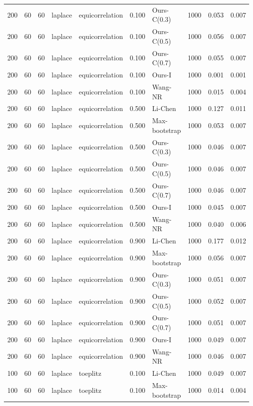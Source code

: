 \begin{tabular}{rrrllrlrrr}
200 & 60 & 60 & laplace & equicorrelation & 0.100 & Ours-C(0.3) & 1000 & 0.053 & 0.007 \\
200 & 60 & 60 & laplace & equicorrelation & 0.100 & Ours-C(0.5) & 1000 & 0.056 & 0.007 \\
200 & 60 & 60 & laplace & equicorrelation & 0.100 & Ours-C(0.7) & 1000 & 0.055 & 0.007 \\
200 & 60 & 60 & laplace & equicorrelation & 0.100 & Ours-I & 1000 & 0.001 & 0.001 \\
200 & 60 & 60 & laplace & equicorrelation & 0.100 & Wang-NR & 1000 & 0.015 & 0.004 \\
200 & 60 & 60 & laplace & equicorrelation & 0.500 & Li-Chen & 1000 & 0.127 & 0.011 \\
200 & 60 & 60 & laplace & equicorrelation & 0.500 & Max-bootstrap & 1000 & 0.053 & 0.007 \\
200 & 60 & 60 & laplace & equicorrelation & 0.500 & Ours-C(0.3) & 1000 & 0.046 & 0.007 \\
200 & 60 & 60 & laplace & equicorrelation & 0.500 & Ours-C(0.5) & 1000 & 0.046 & 0.007 \\
200 & 60 & 60 & laplace & equicorrelation & 0.500 & Ours-C(0.7) & 1000 & 0.046 & 0.007 \\
200 & 60 & 60 & laplace & equicorrelation & 0.500 & Ours-I & 1000 & 0.045 & 0.007 \\
200 & 60 & 60 & laplace & equicorrelation & 0.500 & Wang-NR & 1000 & 0.040 & 0.006 \\
200 & 60 & 60 & laplace & equicorrelation & 0.900 & Li-Chen & 1000 & 0.177 & 0.012 \\
200 & 60 & 60 & laplace & equicorrelation & 0.900 & Max-bootstrap & 1000 & 0.056 & 0.007 \\
200 & 60 & 60 & laplace & equicorrelation & 0.900 & Ours-C(0.3) & 1000 & 0.051 & 0.007 \\
200 & 60 & 60 & laplace & equicorrelation & 0.900 & Ours-C(0.5) & 1000 & 0.052 & 0.007 \\
200 & 60 & 60 & laplace & equicorrelation & 0.900 & Ours-C(0.7) & 1000 & 0.051 & 0.007 \\
200 & 60 & 60 & laplace & equicorrelation & 0.900 & Ours-I & 1000 & 0.049 & 0.007 \\
200 & 60 & 60 & laplace & equicorrelation & 0.900 & Wang-NR & 1000 & 0.046 & 0.007 \\
100 & 60 & 60 & laplace & toeplitz & 0.100 & Li-Chen & 1000 & 0.049 & 0.007 \\
100 & 60 & 60 & laplace & toeplitz & 0.100 & Max-bootstrap & 1000 & 0.014 & 0.004 \\

\end{tabular}

